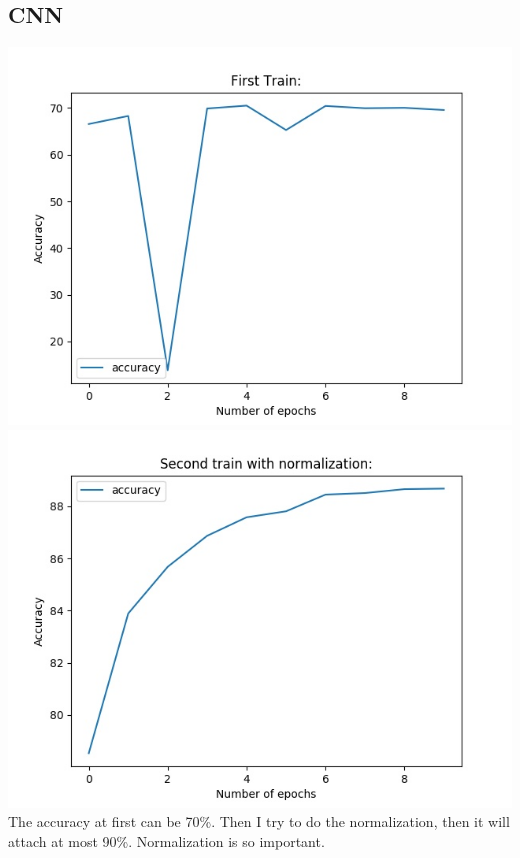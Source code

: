 \documentclass[12pt]{article}
\begin{document}
		\subsection {CNN}
            \includegraphics[height=10cm]{hw3_b_1}\\
            \includegraphics[height=10cm]{hw3_b_2}\\
			The accuracy at first can be 70\%. Then I try to do the normalization, then it will attach at most 90\%. Normalization is so important.
\end{document}

